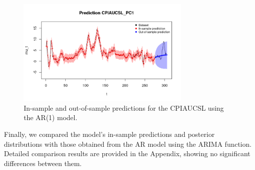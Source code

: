 \begin{figure}[H]
    \centering
    \includegraphics[width=0.75\textwidth]{images/2-AR/infl_prediction.png}
    \caption{In-sample and out-of-sample predictions for the CPIAUCSL using the AR(1) model.}
    \label{fig:AR1_infl_prediction}
\end{figure}
Finally, we compared the model's in-sample predictions and posterior distributions with those obtained from the AR model using the ARIMA function. Detailed comparison results are provided in the Appendix, showing no significant differences between them.